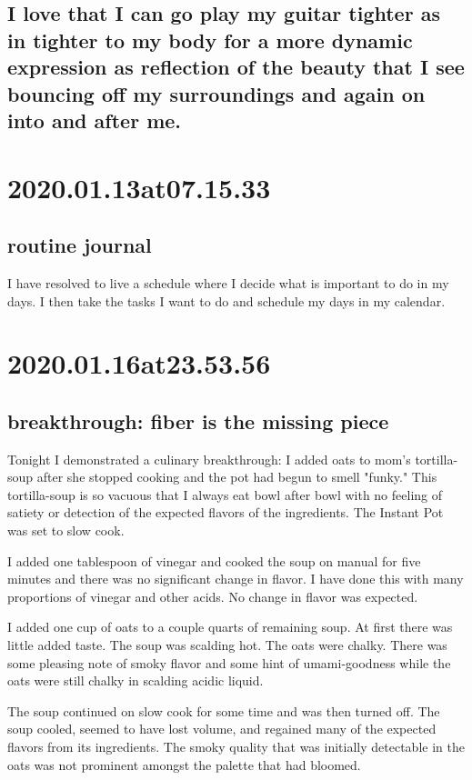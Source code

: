 \subsection*{ I love that I can go play my guitar tighter as in tighter to my body for a more dynamic expression as reflection of the beauty that I see bouncing off my surroundings and again on into and after me. }

\section*{ 2020.01.13at07.15.33 }
\subsection*{ routine journal }
I have resolved to live a schedule where I decide what is important to do in my days. I then take the tasks I want to do and schedule my days in my calendar. 

\section*{ 2020.01.16at23.53.56 }
\subsection*{ breakthrough: fiber is the missing piece }
Tonight I demonstrated a culinary breakthrough: I added oats to mom's tortilla-soup after she stopped cooking and the pot had begun to smell "funky."
This tortilla-soup is so vacuous that I always eat bowl after bowl with no feeling of satiety or detection of the expected flavors of the ingredients.
The Instant Pot was set to slow cook.

I added one tablespoon of vinegar and cooked the soup on manual for five minutes and there was no significant change in flavor.
I have done this with many proportions of vinegar and other acids.
No change in flavor was expected.

I added one cup of oats to a couple quarts of remaining soup.
At first there was little added taste.
The soup was scalding hot.
The oats were chalky.
There was some pleasing note of smoky flavor and some hint of umami-goodness while the oats were still chalky in scalding acidic liquid.

The soup continued on slow cook for some time and was then turned off.
The soup cooled, seemed to have lost volume, and regained many of the expected flavors from its ingredients.
The smoky quality that was initially detectable in the oats was not prominent amongst the palette that had bloomed.

